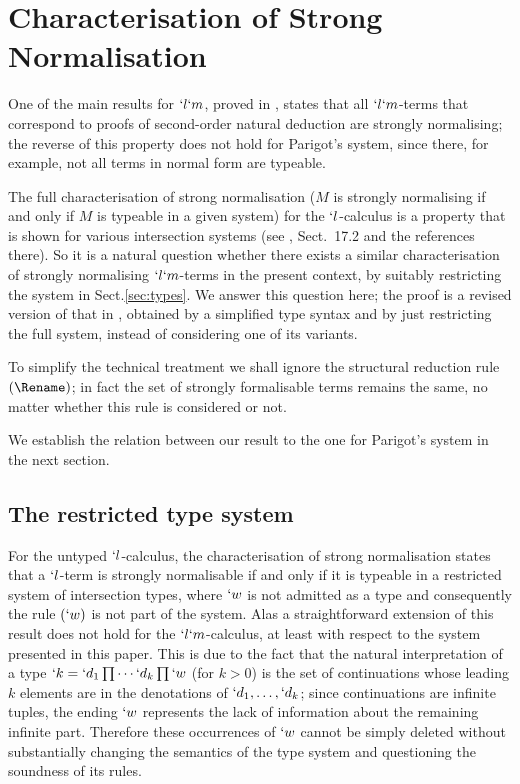 \documentclass{CSML}
\begin{document}
 \section{Characterisation of Strong Normalisation} \label{sec:character}

One of the main results for $`l`m$, proved in \cite{Parigot97}, states that all $`l`m$-terms that correspond to proofs of second-order natural deduction are strongly normalising; the reverse of this property does not hold for Parigot's system, since there, for example, not all terms in normal form are typeable.

The full characterisation of strong normalisation ($M$ is strongly normalising if and only if $M$ is typeable in a given system) for the $`l$-calculus is a property that is shown for various intersection systems (see \cite{Bar2013}, Sect.~17.2 and the references there). So it is a natural question whether there exists a similar characterisation of strongly normalising $`l`m$-terms in the present context, by suitably restricting the system in Sect.\skp\ref{sec:types}.
We answer this question here; the proof is a revised version of that in \cite{BakBdL-ITRS12}, obtained by a simplified type syntax and by just restricting the full system, instead of considering one of its variants. 

To simplify the technical treatment we shall ignore the structural reduction rule
$(\Rename)$; in fact the set of strongly formalisable terms remains the same, no matter whether this rule is considered or not.

We establish the relation between our result to the one for Parigot's system in the next section. 


 \subsection{The restricted type system} \label{sec:system}

For the untyped $`l$-calculus, the characterisation of strong normalisation states that a $`l$-term is strongly normalisable if and only if it is typeable in a restricted system of intersection types, where $`w$ is not admitted as a type and consequently the rule $(`w)$ is not part of the system.
Alas a straightforward extension of this result does not hold for the $`l`m$-calculus, at least with respect to the system presented in this paper. 
This is due to the fact that the natural interpretation of a type $`k = `d_1\prod \cdots`d_k\prod `w $ (for $k>0$) is the set of continuations whose leading $k$ elements are in the denotations of $`d_1,\ldots,`d_k$; since continuations are infinite tuples, the ending $`w$ represents the lack of information about the remaining infinite part. 
Therefore these occurrences of $`w$ cannot be simply deleted without substantially changing the semantics of the type system and questioning the soundness of its rules.
\end{document}
